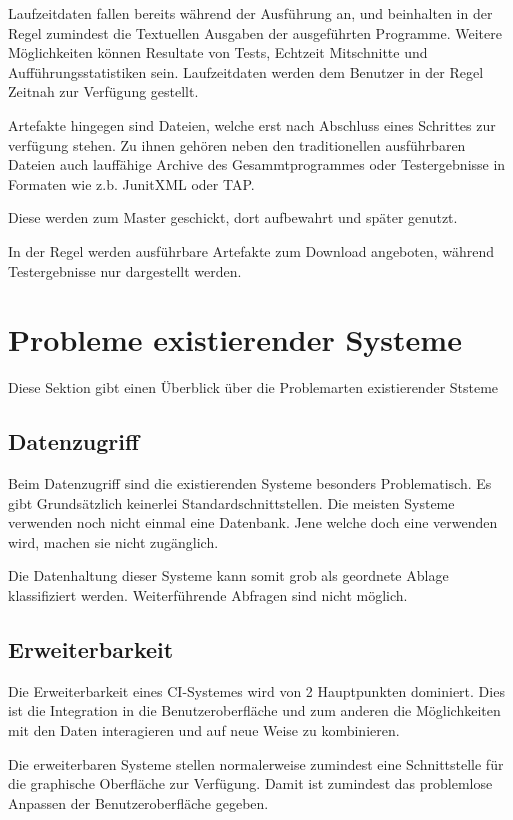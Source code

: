 Laufzeitdaten fallen bereits w\"ahrend der Ausf\"uhrung an,
und beinhalten in der Regel zumindest die Textuellen Ausgaben
der ausgef\"uhrten Programme.
Weitere M\"oglichkeiten k\"onnen Resultate von Tests, Echtzeit Mitschnitte und Aufführungsstatistiken sein.
Laufzeitdaten werden dem Benutzer in der Regel Zeitnah zur Verfügung gestellt.

Artefakte hingegen sind Dateien,
welche erst nach Abschluss eines Schrittes zur verf\"ugung stehen.
Zu ihnen geh\"oren neben den traditionellen ausf\"uhrbaren Dateien
auch lauff\"ahige Archive des Gesammtprogrammes oder Testergebnisse in Formaten wie z.b. JunitXML oder TAP.


Diese werden zum Master geschickt, dort aufbewahrt und sp\"ater genutzt.

In der Regel werden ausf\"uhrbare Artefakte zum Download angeboten,
w\"ahrend Testergebnisse nur dargestellt werden.


\section{Probleme existierender Systeme}

Diese Sektion gibt einen \"Uberblick \"uber die Problemarten existierender Ststeme

\subsection{Datenzugriff}

Beim Datenzugriff sind die existierenden Systeme besonders Problematisch.
Es gibt Grundsätzlich keinerlei Standardschnittstellen.
Die meisten Systeme verwenden noch nicht einmal eine Datenbank.
Jene welche doch eine verwenden wird, machen sie nicht zugänglich.

Die Datenhaltung dieser Systeme kann somit grob als geordnete Ablage klassifiziert werden.
Weiterführende Abfragen sind nicht möglich.

\subsection{Erweiterbarkeit}

Die Erweiterbarkeit eines CI-Systemes wird von 2 Hauptpunkten dominiert.
Dies ist die Integration in die Benutzeroberfl\"ache
und zum anderen die Möglichkeiten mit den Daten interagieren
und auf neue Weise zu kombinieren.

Die erweiterbaren Systeme stellen normalerweise zumindest eine Schnittstelle
für die graphische Oberfläche zur Verfügung.
Damit ist zumindest das problemlose Anpassen der Benutzeroberfläche gegeben.


